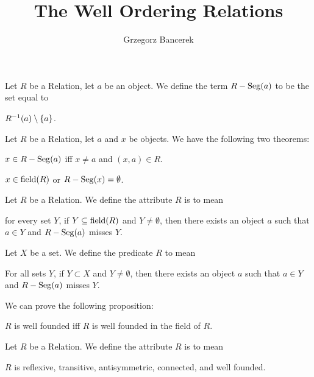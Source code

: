 \documentclass{article}
\title{The Well Ordering Relations}
\author{Grzegorz Bancerek}
\begin{document}
\maketitle

\begin{definition}
Let $R$ be a Relation, let $a$ be an object.
We define the term $R-\operatorname{Seg}(a)$ to be the set equal to
\begin{defn}
\item $R^{-1}(a)\setminus\{a\}$.
\end{defn}
\end{definition}

Let $R$ be a Relation, let $a$ and $x$ be objects. We have the following
two theorems:
\begin{thm}
\item\label{wellord1:1} $x\in R-\operatorname{Seg}(a)$ iff $x\neq a$ and $(x,a)\in R$.
\item\label{wellord1:2} $x\in\operatorname{field}(R)$ or $R-\operatorname{Seg}(x)=\emptyset$.
\end{thm}

\begin{definition}
Let $R$ be a Relation. We define the attribute $R$ is 
to mean
\begin{defn}
\item for every set $Y$, if $Y\subseteq\operatorname{field}(R)$ and $Y\neq\emptyset$,
  then there exists an object $a$ such that $a\in Y$ and $R-\operatorname{Seg}(a)$
  misses $Y$.
\end{defn}
Let $X$ be a set. We define the predicate $R$ 
to mean
\begin{defn}
\item For all sets $Y$, if $Y\subset X$ and $Y\neq\emptyset$,
  then there exists an object $a$ such that $a\in Y$ and $R-\operatorname{Seg}(a)$
  misses $Y$.
\end{defn}
\end{definition}

We can prove the following proposition:
\begin{thm}
\item\label{wellord1:3} $R$ is well founded iff $R$ is well founded in
  the field of $R$.
\end{thm}

\begin{definition}
Let $R$ be a Relation. We define the attribute $R$ is 
to mean
\begin{defn}
\item $R$ is reflexive, transitive, antisymmetric, connected, and well founded.
\end{defn}
\end{definition}
\end{document}
